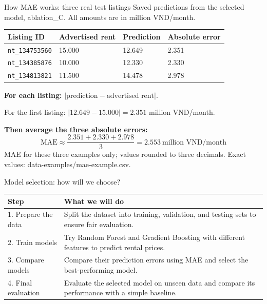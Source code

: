 \documentclass[10pt,t,aspectratio=169]{beamer}
\newcommand{\smallnote}[1]{{\footnotesize\color{muted}#1}}
\begin{document}
\begin{frame}{How MAE works: three real test listings}
\smallnote{Saved predictions from the selected model, ablation\_C. All amounts are in million VND/month.}
\par\vspace{0.25cm}
\small
\renewcommand{\arraystretch}{1.35}
\begin{tabularx}{\textwidth}{@{}L{3.0cm}Y Y Y@{}}
\toprule
\textbf{Listing ID} & \textbf{Advertised rent} & \textbf{Prediction} & \textbf{Absolute error} \\\midrule
\texttt{nt\_134753560} & 15.000 & 12.649 & 2.351 \\
\texttt{nt\_134385876} & 10.000 & 12.330 & 2.330 \\
\texttt{nt\_134813821} & 11.500 & 14.478 & 2.978 \\
\bottomrule
\end{tabularx}
\vspace{0.25cm}
\textbf{For each listing:} $|\text{prediction} - \text{advertised rent}|$.
\par\vspace{0.15cm}
For the first listing: $|12.649 - 15.000| = 2.351$ million VND/month.
\par\vspace{0.15cm}
\textbf{Then average the three absolute errors:}
\[
\mathrm{MAE} \approx \frac{2.351 + 2.330 + 2.978}{3}
= \mathbf{2.553}\ \text{million VND/month}
\]
\vfill
\smallnote{MAE for these three examples only; values rounded to three decimals. Exact values: data-examples/mae-example.csv.}
\end{frame}

\begin{frame}{Model selection: how will we choose?}
\small
\renewcommand{\arraystretch}{1.4}
\begin{tabularx}{\textwidth}{@{}L{2.65cm}Y@{}}
\toprule
\textbf{Step} & \textbf{What we will do} \\\midrule

1. Prepare the data &
Split the dataset into training, validation,
and testing sets to ensure fair evaluation. \\

2. Train models &
Try Random Forest and Gradient Boosting
with different features to predict rental prices. \\

3. Compare models &
Compare their prediction errors using
MAE and select the best-performing model. \\

4. Final evaluation &
Evaluate the selected model on unseen data
and compare its performance with a simple baseline. \\

\bottomrule
\end{tabularx}
\vfill
\end{frame}
\end{document}
